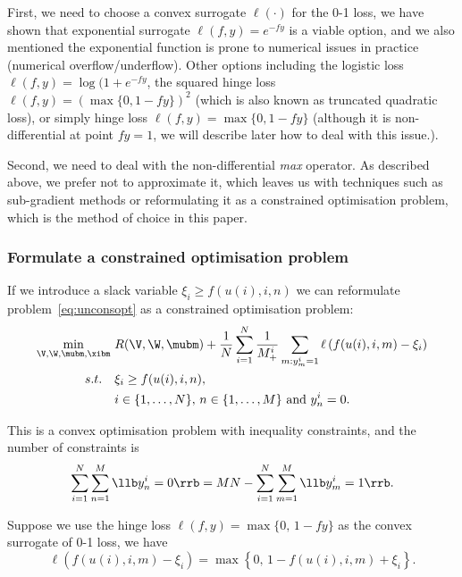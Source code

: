 First, we need to choose a convex surrogate $\ell(\cdot)$ for the 0-1 loss,
we have shown that exponential surrogate $\ell(f, y) = e^{-fy}$ is a viable option,
and we also mentioned the exponential function is prone to numerical issues in practice (\eg numerical overflow/underflow).
Other options including the logistic loss $\ell(f, y) = \log(1 + e^{-fy}$,
the squared hinge loss $\ell(f, y) = \left( \max \{0, 1 - fy\} \right)^2$ (which is also known as truncated quadratic loss),
or simply hinge loss $\ell(f, y) = \max \{0, 1 - fy\}$ 
(although it is non-differential at point $fy = 1$, we will describe later how to deal with this issue.).

Second, we need to deal with the non-differential \emph{max} operator.
As described above, we prefer not to approximate it, 
which leaves us with techniques such as sub-gradient methods or 
reformulating it as a constrained optimisation problem, which is the method of choice in this paper.

\subsubsection{Formulate a constrained optimisation problem}
If we introduce a slack variable $\xi_i \ge f(u(i), i, n)$
we can reformulate problem~\ref{eq:unconsopt} as a constrained optimisation problem:
\begin{equation}
\label{eq:cvxopt}
\begin{aligned}
\min_{\V, \W, \mubm, \xibm} \ & R(\V, \W, \mubm)
  + \frac{1}{N} \sum_{i=1}^N \frac{1}{M_+^i} \sum_{m: y_m^i = 1} \ell \left( f(u(i), i, m) - \xi_i \right) \\
s.t. \quad & 
\xi_i \ge f(u(i), i, n), \\
& i \in \{1,\dots,N\}, \, n \in \{1,\dots,M\} \ \mathrm{and} \ y_n^i = 0.
\end{aligned}
\end{equation}

This is a convex optimisation problem with inequality constraints, 
and the number of constraints is 
$$
\sum_{i=1}^N \sum_{n=1}^M \llb y_n^i = 0 \rrb = MN - \sum_{i=1}^N \sum_{m=1}^M \llb y_m^i = 1 \rrb.
$$

Suppose we use the hinge loss $\ell(f, y) = \max \{ 0, \, 1 - fy \}$ as the convex surrogate of 0-1 loss, we have
\begin{equation*}
\ell \left( f(u(i), i, m) - \xi_i \right) = \max \left\{ 0, \, 1 - f( u(i), i, m) + \xi_i \right\}.
\end{equation*}

